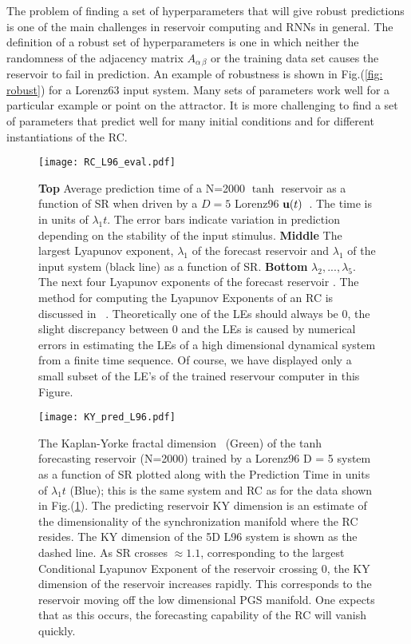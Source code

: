 \documentclass[12pt]{article}
\begin{document}
The problem of finding a set of hyperparameters that will give robust predictions is one of the main challenges in reservoir computing and RNNs in general.  The definition of a robust set of hyperparameters is one in which neither the randomness of the adjacency matrix $A_{\alpha\,\beta}$ or the training data set causes the reservoir to fail in prediction.  An example of robustness is shown in Fig.(\ref{fig: robust}) for a Lorenz63 input system.  Many sets of parameters work well for a particular example or point on the attractor. It is more challenging to find a set of parameters that predict well for many initial conditions and for different instantiations of the RC.
\begin{figure}[htpb!]
    \centering
    \texttt{[image: RC\_L96\_eval.pdf]}
    \caption{{\bf Top} Average prediction time of a N=2000 $\tanh$ reservoir as a function of SR when driven by a $D=5$ Lorenz96 $\mbox{$\bf{u}$}(t)$~\cite{lor96}. The time is in units of $\lambda_1 t$.  The error bars indicate variation in prediction depending on the stability of the input stimulus.
    {\bf Middle} The largest Lyapunov exponent, $\lambda_1$ of the forecast reservoir and $\lambda_1$ of the input system (black line) as a function of SR.
    {\bf Bottom} $\lambda_2,...,\lambda_5$. The next four Lyapunov exponents of the forecast reservoir . The method for computing the Lyapunov Exponents of an RC is discussed in  ~\cite{abar96,eckmann85,verstraten09}. Theoretically one of the LEs should always be 0, the slight discrepancy between 0 and the LEs is caused by numerical errors in estimating the LEs of a high dimensional dynamical system from a finite time sequence. Of course, we have displayed only a small subset of the LE's of the trained reservour computer in this Figure.}
    \label{fig: lyap_predlor96}
\end{figure}

\begin{figure}[htpb!]
    \centering
    \texttt{[image: KY\_pred\_L96.pdf]}
    \caption{The Kaplan-Yorke fractal dimension~\cite{KaplanYorke79, KaplanYorke83} (Green) of the tanh forecasting reservoir (N=2000) trained by a Lorenz96 D = 5 system as a function of SR plotted along with the Prediction Time in units of $\lambda_1 t$ (Blue); this is the same system and RC as for the data shown in Fig.(\ref{fig: lyap_predlor96}).  The predicting reservoir KY dimension is an estimate of the dimensionality of the synchronization manifold where the RC resides.  The KY dimension of the 5D L96 system is shown as the dashed line.  As SR crosses $\approx 1.1$, corresponding to the largest Conditional Lyapunov Exponent of the reservoir crossing 0, the KY dimension of the reservoir increases rapidly.  This corresponds to the reservoir moving off the low dimensional PGS manifold. One expects that as this occurs, the forecasting capability of the RC will vanish quickly.}
    \label{fig: KYdim}
\end{figure}
\end{document}
